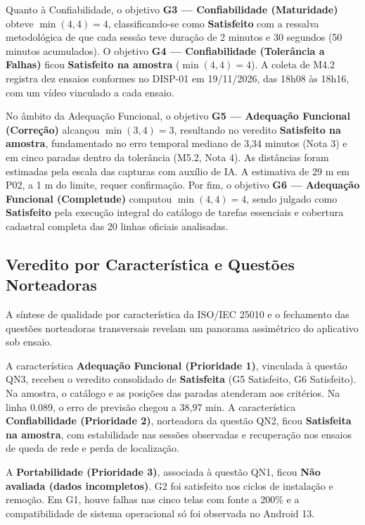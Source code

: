 \documentclass[11pt,a4paper]{article}
\begin{document}
Quanto à Confiabilidade, o objetivo \textbf{G3 --- Confiabilidade (Maturidade)} obteve $\min(4, 4) = 4$, classificando-se como \textbf{Satisfeito} com a ressalva metodológica de que cada sessão teve duração de 2 minutos e 30 segundos (50 minutos acumulados). O objetivo \textbf{G4 --- Confiabilidade (Tolerância a Falhas)} ficou \textbf{Satisfeito na amostra} ($\min(4, 4) = 4$). A coleta de M4.2 registra dez ensaios conformes no DISP-01 em 19/11/2026, das 18h08 às 18h16, com um vídeo vinculado a cada ensaio.

No âmbito da Adequação Funcional, o objetivo \textbf{G5 --- Adequação Funcional (Correção)} alcançou $\min(3, 4) = 3$, resultando no veredito \textbf{Satisfeito na amostra}, fundamentado no erro temporal mediano de 3,34 minutos (Nota 3) e em cinco paradas dentro da tolerância (M5.2, Nota 4). As distâncias foram estimadas pela escala das capturas com auxílio de IA. A estimativa de 29 m em P02, a 1 m do limite, requer confirmação. Por fim, o objetivo \textbf{G6 --- Adequação Funcional (Completude)} computou $\min(4, 4) = 4$, sendo julgado como \textbf{Satisfeito} pela execução integral do catálogo de tarefas essenciais e cobertura cadastral completa das 20 linhas oficiais analisadas.

\subsection{Veredito por Característica e Questões Norteadoras}
\label{sec:caracteristicas_qn}

A síntese de qualidade por característica da ISO/IEC 25010 e o fechamento das questões norteadoras transversais revelam um panorama assimétrico do aplicativo sob ensaio.

A característica \textbf{Adequação Funcional (Prioridade 1)}, vinculada à questão QN3, recebeu o veredito consolidado de \textbf{Satisfeita} (G5 Satisfeito, G6 Satisfeito). Na amostra, o catálogo e as posições das paradas atenderam aos critérios. Na linha 0.089, o erro de previsão chegou a 38,97 min. A característica \textbf{Confiabilidade (Prioridade 2)}, norteadora da questão QN2, ficou \textbf{Satisfeita na amostra}, com estabilidade nas sessões observadas e recuperação nos ensaios de queda de rede e perda de localização.

A \textbf{Portabilidade (Prioridade 3)}, associada à questão QN1, ficou \textbf{Não avaliada (dados incompletos)}. G2 foi satisfeito nos ciclos de instalação e remoção. Em G1, houve falhas nas cinco telas com fonte a 200\% e a compatibilidade de sistema operacional só foi observada no Android 13.
\end{document}
